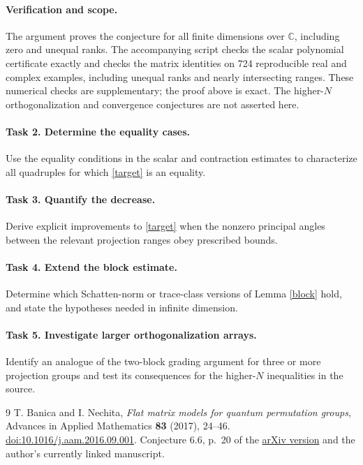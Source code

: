 \documentclass[11pt]{article}
\begin{document}
\paragraph{Verification and scope.}
The argument proves the conjecture for all finite dimensions over
$\mathbb C$, including zero and unequal ranks. The accompanying script
checks the scalar polynomial certificate exactly and checks the matrix
identities on 724 reproducible real and complex examples, including
unequal ranks and nearly intersecting ranges. These numerical checks
are supplementary; the proof above is exact. The higher-$N$
orthogonalization and convergence conjectures are not asserted here.

\paragraph{Task 2. Determine the equality cases.}
Use the equality conditions in the scalar and contraction estimates
to characterize all quadruples for which \eqref{target} is an equality.

\paragraph{Task 3. Quantify the decrease.}
Derive explicit improvements to \eqref{target} when the nonzero principal
angles between the relevant projection ranges obey prescribed bounds.

\paragraph{Task 4. Extend the block estimate.}
Determine which Schatten-norm or trace-class versions of Lemma
\ref{block} hold, and state the hypotheses needed in infinite dimension.

\paragraph{Task 5. Investigate larger orthogonalization arrays.}
Identify an analogue of the two-block grading argument for three or
more projection groups and test its consequences for the higher-$N$
inequalities in the source.

\begin{thebibliography}{9}
T. Banica and I. Nechita,
\emph{Flat matrix models for quantum permutation groups},
Advances in Applied Mathematics \textbf{83} (2017), 24--46.
\href{https://doi.org/10.1016/j.aam.2016.09.001}{doi:10.1016/j.aam.2016.09.001}.
Conjecture 6.6, p.~20 of the
\href{https://arxiv.org/abs/1602.04456}{arXiv version} and the author's
currently linked manuscript.
\end{thebibliography}
\end{document}
